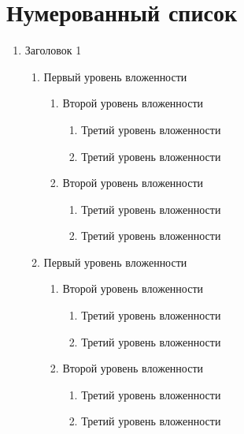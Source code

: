 \documentclass[a4paper,12pt]{article}
\begin{document}
\section{Нумерованный список}
\begin{enumerate}
    \item Заголовок 1
          \begin{enumerate}
              \item Первый уровень вложенности
                    \begin{enumerate}
                        \item Второй уровень вложенности
                              \begin{enumerate}
                                  \item Третий уровень вложенности
                                  \item Третий уровень вложенности
                              \end{enumerate}
                        \item Второй уровень вложенности
                              \begin{enumerate}
                                  \item Третий уровень вложенности
                                  \item Третий уровень вложенности
                              \end{enumerate}
                    \end{enumerate}
              \item Первый уровень вложенности
                    \begin{enumerate}
                        \item Второй уровень вложенности
                              \begin{enumerate}
                                  \item Третий уровень вложенности
                                  \item Третий уровень вложенности
                              \end{enumerate}
                        \item Второй уровень вложенности
                              \begin{enumerate}
                                  \item Третий уровень вложенности
                                  \item Третий уровень вложенности

\end{enumerate}
\end{enumerate}
\end{enumerate}
\end{enumerate}
\end{document}
